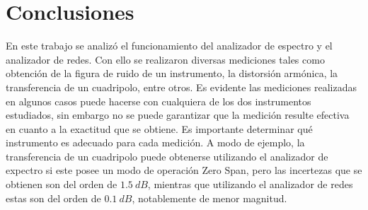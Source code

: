 \documentclass[a4paper,10pt]{article}
\begin{document}
	\newpage
	\section{Conclusiones}
	\indent En este trabajo se analiz\'o el funcionamiento del analizador de espectro y el analizador de redes. Con ello se realizaron diversas mediciones tales como obtenci\'on de la figura de ruido de un instrumento, la distorsi\'on arm\'onica, la transferencia de un cuadripolo, entre otros. Es evidente las mediciones realizadas en algunos casos puede hacerse con cualquiera de los dos instrumentos estudiados, sin embargo no se puede garantizar que la medici\'on resulte efectiva en cuanto a la exactitud que se obtiene. Es importante determinar qu\'e instrumento es adecuado para cada medici\'on. A modo de ejemplo, la transferencia de un cuadripolo puede obtenerse utilizando el analizador de expectro si este posee un modo de operaci\'on Zero Span, pero las incertezas que se obtienen son del orden de $1.5~dB$, mientras que utilizando el analizador de redes estas son del orden de $0.1~dB$, notablemente de menor magnitud.
\end{document}
